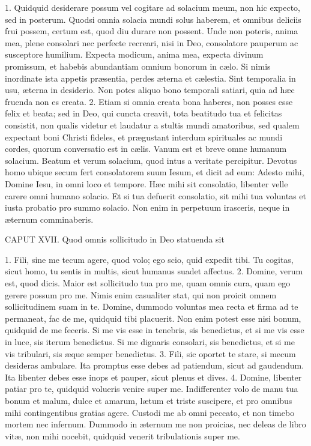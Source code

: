 \documentclass[twoside]{article}
\begin{document}
1. Quidquid desiderare possum vel cogitare ad solacium meum, non hic expecto, sed in posterum. Quodsi omnia solacia mundi solus haberem, et omnibus deliciis frui possem, certum est, quod diu durare non possent. Unde non poteris, anima mea, plene consolari nec perfecte recreari, nisi in Deo, consolatore pauperum ac susceptore humilium. Expecta modicum, anima mea, expecta divinum promissum, et habebis abundantiam omnium bonorum in cælo. Si nimis inordinate ista appetis præsentia, perdes æterna et cælestia. Sint temporalia in usu, æterna in desiderio. Non potes aliquo bono temporali satiari, quia ad hæc fruenda non es creata.
2. Etiam si omnia creata bona haberes, non posses esse felix et beata; sed in Deo, qui cuncta creavit, tota beatitudo tua et felicitas consistit, non qualis videtur et laudatur a stultis mundi amatoribus, sed qualem expectant boni Christi fideles, et prægustant interdum spirituales ac mundi cordes, quorum conversatio est in cælis. Vanum est et breve omne humanum solacium. Beatum et verum solacium, quod intus a veritate percipitur. Devotus homo ubique secum fert consolatorem suum Iesum, et dicit ad eum: Adesto mihi, Domine Iesu, in omni loco et tempore. Hæc mihi sit consolatio, libenter velle carere omni humano solacio. Et si tua defuerit consolatio, sit mihi tua voluntas et iusta probatio pro summo solacio. Non enim in perpetuum irasceris, neque in æternum comminaberis.


CAPUT XVII.
Quod omnis sollicitudo in Deo statuenda sit

1. Fili, sine me tecum agere, quod volo; ego scio, quid expedit tibi. Tu cogitas, sicut homo, tu sentis in multis, sicut humanus suadet affectus.
2. Domine, verum est, quod dicis. Maior est sollicitudo tua pro me, quam omnis cura, quam ego gerere possum pro me. Nimis enim casualiter stat, qui non proicit omnem sollicitudinem suam in te. Domine, dummodo voluntas mea recta et firma ad te permaneat, fac de me, quidquid tibi placuerit. Non enim potest esse nisi bonum, quidquid de me feceris. Si me vis esse in tenebris, sis benedictus, et si me vis esse in luce, sis iterum benedictus. Si me dignaris consolari, sis benedictus, et si me vis tribulari, sis æque semper benedictus.
3. Fili, sic oportet te stare, si mecum desideras ambulare. Ita promptus esse debes ad patiendum, sicut ad gaudendum. Ita libenter debes esse inops et pauper, sicut plenus et dives.
4. Domine, libenter patiar pro te, quidquid volueris venire super me. Indifferenter volo de manu tua bonum et malum, dulce et amarum, lætum et triste suscipere, et pro omnibus mihi contingentibus gratias agere. Custodi me ab omni peccato, et non timebo mortem nec infernum. Dummodo in æternum me non proicias, nec deleas de libro vitæ, non mihi nocebit, quidquid venerit tribulationis super me.
\end{document}
